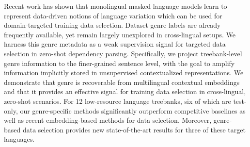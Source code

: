 Recent work has shown that monolingual masked language models learn to represent data-driven notions of language variation which can be used for domain-targeted training data selection. Dataset genre labels are already frequently available, yet remain largely unexplored in cross-lingual setups. We harness this genre metadata as a weak supervision signal for targeted data selection in zero-shot dependency parsing. Specifically, we project treebank-level genre information to the finer-grained sentence level, with the goal to amplify information implicitly stored in unsupervised contextualized representations. We demonstrate that genre is recoverable from multilingual contextual embeddings and that it provides an effective signal for training data selection in cross-lingual, zero-shot scenarios. For 12 low-resource language treebanks, six of which are test-only, our genre-specific methods significantly outperform competitive baselines as well as recent embedding-based methods for data selection. Moreover, genre-based data selection provides new state-of-the-art results for three of these target languages.
